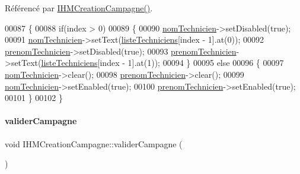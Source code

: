 Référencé par \hyperlink{ihmcreationcampagne_8cpp_source_l00011}{I\+H\+M\+Creation\+Campagne()}.


\begin{DoxyCode}
00087 \{
00088     \textcolor{keywordflow}{if}(index > 0)
00089     \{
00090         \hyperlink{class_i_h_m_creation_campagne_a5546fee9a51daceb1b719b105427dfe9}{nomTechnicien}->setDisabled(\textcolor{keyword}{true});
00091         \hyperlink{class_i_h_m_creation_campagne_a5546fee9a51daceb1b719b105427dfe9}{nomTechnicien}->setText(\hyperlink{class_i_h_m_creation_campagne_aee78d20f0263359283cbcbc50fac3143}{listeTechniciens}[index - 1].at(0));
00092         \hyperlink{class_i_h_m_creation_campagne_a95e0a4f224110a79731e947baa505b7e}{prenomTechnicien}->setDisabled(\textcolor{keyword}{true});
00093         \hyperlink{class_i_h_m_creation_campagne_a95e0a4f224110a79731e947baa505b7e}{prenomTechnicien}->setText(\hyperlink{class_i_h_m_creation_campagne_aee78d20f0263359283cbcbc50fac3143}{listeTechniciens}[index - 1].at(1));
00094     \}
00095     \textcolor{keywordflow}{else}
00096     \{
00097         \hyperlink{class_i_h_m_creation_campagne_a5546fee9a51daceb1b719b105427dfe9}{nomTechnicien}->clear();
00098         \hyperlink{class_i_h_m_creation_campagne_a95e0a4f224110a79731e947baa505b7e}{prenomTechnicien}->clear();
00099         \hyperlink{class_i_h_m_creation_campagne_a5546fee9a51daceb1b719b105427dfe9}{nomTechnicien}->setEnabled(\textcolor{keyword}{true});
00100         \hyperlink{class_i_h_m_creation_campagne_a95e0a4f224110a79731e947baa505b7e}{prenomTechnicien}->setEnabled(\textcolor{keyword}{true});
00101     \}
00102 \}
\end{DoxyCode}
\mbox{\label{class_i_h_m_creation_campagne_ad5c63453b1b8d1099a43ff3522244072}} 
\paragraph{\texorpdfstring{valider\+Campagne}{validerCampagne}}
{\footnotesize\ttfamily void I\+H\+M\+Creation\+Campagne\+::valider\+Campagne (\begin{DoxyParamCaption}{ }\end{DoxyParamCaption})\hspace{0.3cm}{\ttfamily [slot]}}



